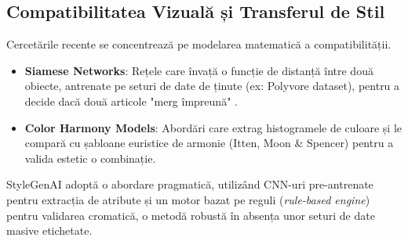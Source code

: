 \subsection{Compatibilitatea Vizuală și Transferul de Stil}
Cercetările recente se concentrează pe modelarea matematică a compatibilității.
\begin{itemize}
    \item \textbf{Siamese Networks}: Rețele care învață o funcție de distanță între două obiecte, antrenate pe seturi de date de ținute (ex: Polyvore dataset), pentru a decide dacă două articole "merg împreună" \cite{vaswani2017attention}.
    \item \textbf{Color Harmony Models}: Abordări care extrag histogramele de culoare și le compară cu șabloane euristice de armonie (Itten, Moon & Spencer) pentru a valida estetic o combinație.
\end{itemize}

StyleGenAI adoptă o abordare pragmatică, utilizând CNN-uri pre-antrenate pentru extracția de atribute și un motor bazat pe reguli (\textit{rule-based engine}) pentru validarea cromatică, o metodă robustă în absența unor seturi de date masive etichetate.
